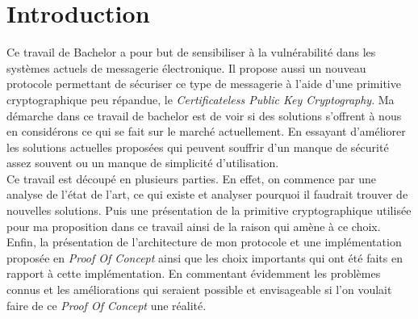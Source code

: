 \chapter{Introduction}
\label{ch:intro}

Ce travail de Bachelor a pour but de sensibiliser à la vulnérabilité dans les systèmes actuels de messagerie électronique. Il propose aussi un nouveau protocole permettant de sécuriser ce type de messagerie à l'aide d'une primitive cryptographique peu répandue, le \textit{Certificateless Public Key Cryptography}. Ma démarche dans ce travail de bachelor est de voir si des solutions s'offrent à nous en considérons ce qui se fait sur le marché actuellement. En essayant d'améliorer les solutions actuelles proposées qui peuvent souffrir d'un manque de sécurité assez souvent ou un manque de simplicité d'utilisation.\\
Ce travail est découpé en plusieurs parties. En effet, on commence par une analyse de l'état de l'art, ce qui existe et analyser pourquoi il faudrait trouver de nouvelles solutions. Puis une présentation de la primitive cryptographique utilisée pour ma proposition dans ce travail ainsi de la raison qui amène à ce choix. Enfin, la présentation de l'architecture de mon protocole et une implémentation proposée en \textit{Proof Of Concept} ainsi que les choix importants qui ont été faits en rapport à cette implémentation. En commentant évidemment les problèmes connus et les améliorations qui seraient possible et envisageable si l'on voulait faire de ce \textit{Proof Of Concept} une réalité.